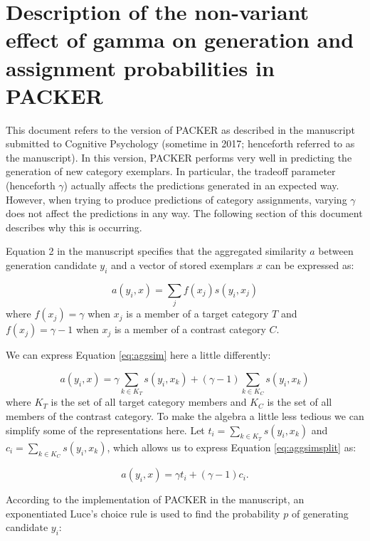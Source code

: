 \documentclass[12pt]{article} \usepackage[letterpaper, margin=1in,
\begin{document}
\section{Description of the non-variant effect of gamma on generation and
assignment probabilities in PACKER}

This document refers to the version of PACKER as described in the manuscript
submitted to Cognitive Psychology (sometime in 2017; henceforth referred to as
the manuscript). In this version, PACKER performs very well in predicting the
generation of new category exemplars. In particular, the tradeoff parameter
(henceforth $\gamma$) actually affects the predictions generated in an expected
way. However, when trying to produce predictions of category assignments,
varying $\gamma$ does not affect the predictions in any way. The following
section of this document describes why this is occurring.

Equation 2 in the manuscript specifies that the aggregated similarity $a$
between generation candidate $y_i$ and a vector of stored exemplars $x$ can be
expressed as:

\begin{equation} a(y_i, x) = \sum_j{f(x_j) s(y_i, x_j)}
\label{eq:aggsim}
\end{equation} where $f(x_j) = \gamma$ when $x_j$ is a member of a target
category $T$ and $f(x_j) = \gamma - 1$ when $x_j$ is a member of a contrast
category $C$.

We can express Equation \ref{eq:aggsim} here a little differently:

\begin{equation} a(y_i,x) = \gamma \sum_{k \in K_T}{s(y_i,x_k)} + (\gamma-1)
\sum_{k \in K_C}{s(y_i,x_k)}
\label{eq:aggsimsplit}
\end{equation} where $K_T$ is the set of all target category members and $K_C$ is
the set of all members of the contrast category. To make the algebra a little
less tedious we can simplify some of the representations here. Let $t_i =
\sum_{k \in K_T}{s(y_i,x_k)}$ and $c_i = \sum_{k \in K_C}{s(y_i,x_k)}$, which allows
us to express Equation \ref{eq:aggsimsplit} as:

\begin{equation} a(y_i,x) = \gamma t_i + (\gamma-1) c_i .
\label{eq:aggsimsimp}
\end{equation}

According to the implementation of PACKER in the manuscript, an exponentiated
Luce's choice rule is used to find the probability $p$ of generating candidate
$y_i$:
\end{document}

